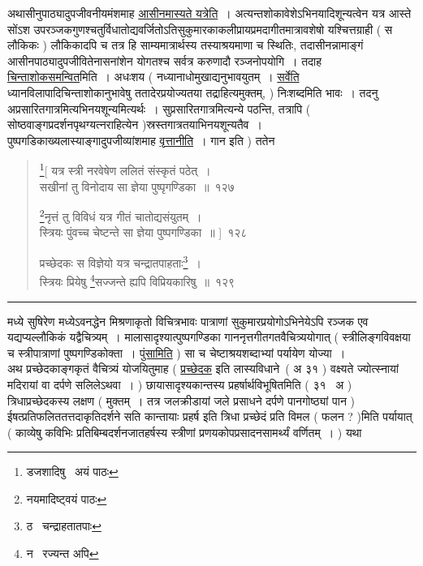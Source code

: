 \documentclass[11pt, openany]{book}
\begin{document}
अथासीनुपाठ्यादुपजीवनीयमंशमाह \underline{आसीनमास्यते यत्रेति}~। अत्यन्तशोकावेशेऽभिनयादिशून्यत्वेन यत्र आस्ते सोंऽश उपरञ्जकगुणश्चतुर्विधातोद्यवर्जितोऽतिसुकुमारकाकलीप्रायप्रमदागीतमात्रावशेषो यश्चित्तग्राही ( स लौकिकः ) लौकिकादपि च तत्र हि साम्यमात्रार्थस्य तस्याश्रयमाणा च स्थितिः, तदासीनन्नामाङ्गं आसीनपाठ्यादुपजीवितेनासनांशेन योगतश्च सर्वत्र करुणादौ रञ्जनोपयोगि~। तदाह \underline{चिन्ताशोकसमन्वित}मिति~। अधःशय ( नध्यानाधोमुखाद्यनुभावयुतम्~। \underline{सर्वेति} ध्यानविलापादिचिन्ताशोकानुभावेषु ततादेरप्रयोज्यतया तद्राहित्यमुक्तम्, ) निःशब्दमिति भावः~। तदनु अप्रसारितगात्रमित्यभिनयशून्यमित्यर्थः~। सुप्रसारितगात्रमित्यन्ये पठन्ति, तत्रापि ( सोष्ठवाङ्गप्रदर्शनपृथग्यत्नराहित्येन )स्रस्तगात्रतयाभिनयशून्यतैव~।\\

पुष्पगडिकाख्यलास्याङ्गादुपजीव्यांशमाह \underline{वृत्तानीति}~। गान इति ) ततेन

\newpage

\begin{quote}
{\na \renewcommand{\thefootnote}{1}\footnote{डजशादिषु \textendash\ अयं पाठः}[ यत्र स्त्री नरवेषेण ललितं संस्कृतं पठेत्~।\\
सखीनां तु विनोदाय सा ज्ञेया पुष्पृगण्डिका~॥~१२७

\renewcommand{\thefootnote}{2}\footnote{नयमादिष्ट्वयं पाठः}नृत्तं तु विविधं यत्र गीतं चातोद्यसंयुतम्~।\\
स्त्रियः पुंवच्च चेष्टन्ते सा ज्ञेया पुष्पगण्डिका~॥ ]~१२८

प्रच्छेदकः स विज्ञेयो यत्र चन्द्रातपाहताः\renewcommand{\thefootnote}{3}\footnote{ठ \textendash\ चन्द्राहतातपाः}~।\\
स्त्रियः प्रियेषु \renewcommand{\thefootnote}{4}\footnote{न \textendash\ रज्यन्त अपि}सज्जन्ते ह्यपि विप्रियकारिषु~॥~१२९}
\end{quote}

\hrule

\vspace{2mm}
\noindent
मध्ये सुषिरेण मध्येऽवनद्धेन मिश्रणाकृतो विचित्रभावः पात्राणां सुकुमारप्रयोगोऽभिनेयेऽपि रञ्जक एव यद्यप्यल्लौकिकं यद्वैचित्र्यम्~। मालासादृश्यात्पुष्पगण्डिका गाननृत्तगीतगतवैचित्र्ययोगात् ( स्त्रीलिङ्गविवक्षया च स्त्रीपात्राणां पुष्पगण्डिकोक्ता~। \underline{पुंसामिति} ) सा च चेष्टाश्रयशब्दाभ्यां पर्यायेण योज्या~।\\

अथ प्रच्छेदकाङ्गकृतं वैचित्र्यं योजयितुमाह ( \underline{प्रच्छेदक} इति लास्यविधाने\textendash\ ( अ ३१ ) वक्ष्यते {\qt ज्योत्स्नायां मदिरायां वा दर्पणे सलिलेऽथवा~। ) छायासादृश्यकान्तस्य प्रहर्षार्थविभूषित}मिति ( ३१ \textendash\ अ ) त्रिधाप्रच्छेदकस्य लक्षण ( मुक्तम्~। तत्र जलक्रीडायां जले प्रसाधने दर्पणे पानगोष्ठ्यां पान ) ईषत्प्रतिफलिततत्तदाकृतिदर्शने सति कान्तायाः प्रहर्ष इति त्रिधा प्रच्छेदं प्रति विमल ( फलन ? )मिति पर्यायात् ( काव्येषु कविभिः प्रतिबिम्बदर्शनजातहर्षस्य स्त्रीणां प्रणयकोपप्रसादनसामर्थ्यं वर्णितम्~। ) यथा\textendash
\end{document}
